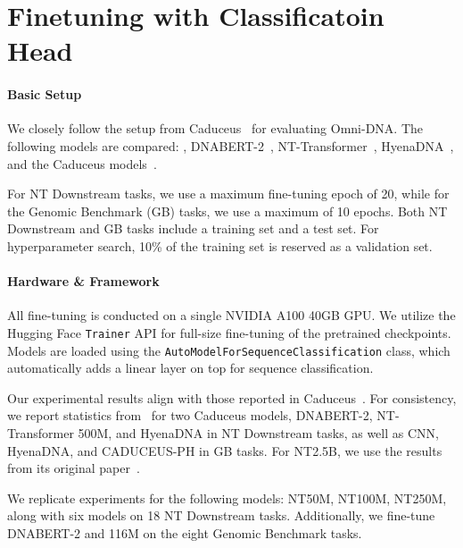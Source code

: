 \section{Finetuning with Classificatoin Head}
\label{app:finetune_ch}
\label{app:nt_downstream_ft}
\label{app:gb_ft}
\paragraph{Basic Setup} 
We closely follow the setup from Caduceus~\cite{schiff2024caduceus} for evaluating Omni-DNA. The following models are compared: \method, DNABERT-2~\cite{zhou2023dnabert}, NT-Transformer~\cite{dalla2024nucleotide}, HyenaDNA~\cite{nguyen2024hyenadna}, and the Caduceus models~\cite{schiff2024caduceus}.  

For NT Downstream tasks, we use a maximum fine-tuning epoch of 20, while for the Genomic Benchmark (GB) tasks, we use a maximum of 10 epochs. Both NT Downstream and GB tasks include a training set and a test set. For hyperparameter search, 10\% of the training set is reserved as a validation set.  

\paragraph{Hardware \& Framework} 
All fine-tuning is conducted on a single NVIDIA A100 40GB GPU. We utilize the Hugging Face \texttt{Trainer} API for full-size fine-tuning of the pretrained checkpoints. Models are loaded using the \texttt{AutoModelForSequenceClassification} class, which automatically adds a linear layer on top for sequence classification.  

Our experimental results align with those reported in Caduceus~\cite{schiff2024caduceus}. For consistency, we report statistics from~\cite{schiff2024caduceus} for two Caduceus models, DNABERT-2, NT-Transformer 500M, and HyenaDNA in NT Downstream tasks, as well as CNN, HyenaDNA, and CADUCEUS-PH in GB tasks. For NT2.5B, we use the results from its original paper~\cite{dalla2024nucleotide}.

We replicate experiments for the following models: NT50M, NT100M, NT250M, along with six \method models on 18 NT Downstream tasks. Additionally, we fine-tune DNABERT-2 and \method 116M on the eight Genomic Benchmark tasks.  

